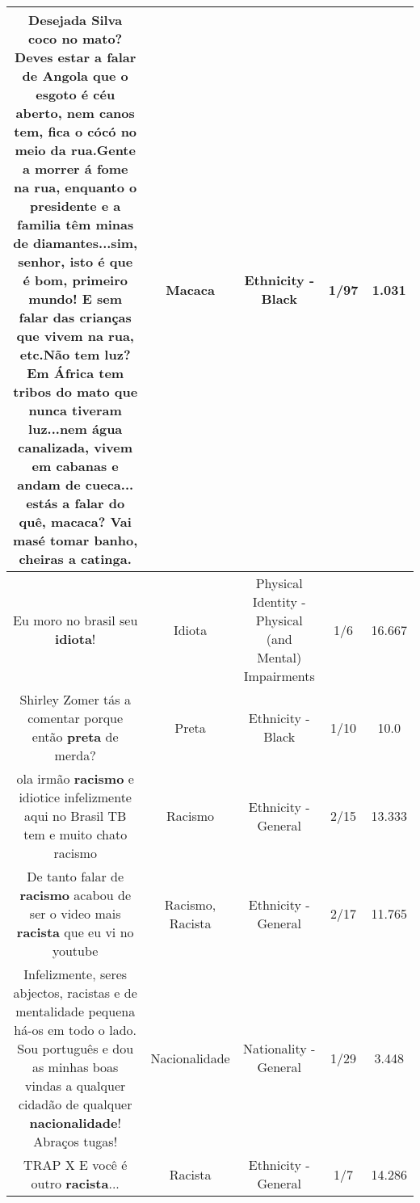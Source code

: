 \documentclass[11pt]{article}
\newlength\mylength
\begin{document}
\begin{center}
\begin{longtable}{|C{.65\mylength}|C{.30\mylength}|C{.12\mylength}|C{.12\mylength}|C{.12\mylength}|}
  \small Desejada Silva coco no mato? Deves estar a falar de Angola que o esgoto é céu aberto, nem canos tem, fica o cócó no meio da rua.Gente a morrer á fome na rua, enquanto o presidente e a familia têm minas de diamantes...sim, senhor, isto é que é bom, primeiro mundo! E sem falar das crianças que vivem na rua, etc.Não tem luz? Em África tem tribos do mato que nunca tiveram luz...nem água canalizada, vivem em cabanas e andam de cueca... estás a falar do quê, \textbf{macaca}? Vai masé tomar banho, cheiras a catinga.\normalsize   & Macaca & Ethnicity - Black & 1/97 & 1.031 \\  \hline
  \small Eu moro no brasil seu \textbf{idiota}!\normalsize   & Idiota & Physical Identity - Physical (and Mental) Impairments & 1/6 & 16.667 \\  \hline
  \small Shirley Zomer tás a comentar porque então \textbf{preta} de merda?\normalsize   & Preta & Ethnicity - Black & 1/10 & 10.0 \\  \hline
  \small ola irmão \textbf{racismo} e idiotice infelizmente aqui no Brasil TB tem e muito chato racismo\normalsize   & Racismo & Ethnicity - General & 2/15 & 13.333 \\  \hline
  \small De tanto falar de \textbf{racismo} acabou de ser o video mais \textbf{racista} que eu vi no youtube\normalsize   & Racismo, Racista & Ethnicity - General & 2/17 & 11.765 \\  \hline
  \small Infelizmente, seres abjectos, racistas e de mentalidade pequena há-os em todo o lado. Sou português e dou as minhas boas vindas a qualquer cidadão de qualquer \textbf{nacionalidade}! Abraços tugas!\normalsize   & Nacionalidade & Nationality - General & 1/29 & 3.448 \\  \hline
  \small TRAP X E você é outro \textbf{racista}...\normalsize   & Racista & Ethnicity - General & 1/7 & 14.286 \\  \hline

\end{longtable}
\end{center}
\end{document}
